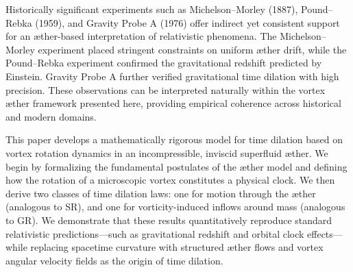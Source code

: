 Historically significant experiments such as Michelson–Morley (1887), Pound–Rebka (1959), and Gravity Probe A (1976) offer indirect yet consistent support for an æther-based interpretation of relativistic phenomena. The Michelson–Morley experiment placed stringent constraints on uniform æther drift, while the Pound–Rebka experiment confirmed the gravitational redshift predicted by Einstein. Gravity Probe A further verified gravitational time dilation with high precision. These observations can be interpreted naturally within the vortex æther framework presented here, providing empirical coherence across historical and modern domains.

This paper develops a mathematically rigorous model for time dilation based on vortex rotation dynamics in an incompressible, inviscid superfluid æther. We begin by formalizing the fundamental postulates of the æther model and defining how the rotation of a microscopic vortex constitutes a physical clock. We then derive two classes of time dilation laws: one for motion through the æther (analogous to SR), and one for vorticity-induced inflows around mass (analogous to GR). We demonstrate that these results quantitatively reproduce standard relativistic predictions—such as gravitational redshift and orbital clock effects—while replacing spacetime curvature with structured æther flows and vortex angular velocity fields as the origin of time dilation.
